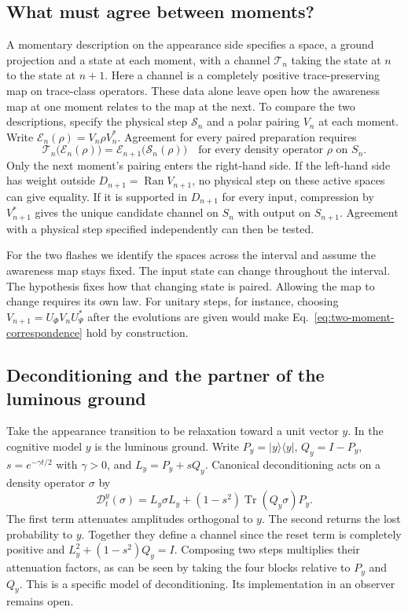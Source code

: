 \documentclass[11pt]{article}
\theoremstyle{definition}
\DeclareMathOperator{\Ran}{Ran}
\DeclareMathOperator{\Tr}{Tr}
\newcommand{\ket}[1]{\lvert #1\rangle}
\newcommand{\bra}[1]{\langle #1\rvert}
\begin{document}
\subsection{What must agree between moments?}
A momentary description on the appearance side specifies a space, a ground projection and a state at each moment, with a channel $\mathcal T_n$ taking the state at $n$ to the state at $n+1$. Here a channel is a completely positive trace-preserving map on trace-class operators. These data alone leave open how the awareness map at one moment relates to the map at the next. To compare the two descriptions, specify the physical step $\mathcal S_n$ and a polar pairing $V_n$ at each moment. Write $\mathcal E_n(\rho)=V_n\rho V_n^*$. Agreement for every paired preparation requires
\begin{equation}
 \mathcal T_n\bigl(\mathcal E_n(\rho)\bigr)
   =\mathcal E_{n+1}\bigl(\mathcal S_n(\rho)\bigr)
 \quad\text{for every density operator $\rho$ on $S_n$.}
 \label{eq:two-moment-correspondence}
\end{equation}
Only the next moment's pairing enters the right-hand side. If the left-hand side has weight outside $D_{n+1}=\Ran V_{n+1}$, no physical step on these active spaces can give equality. If it is supported in $D_{n+1}$ for every input, compression by $V_{n+1}^*$ gives the unique candidate channel on $S_n$ with output on $S_{n+1}$. Agreement with a physical step specified independently can then be tested.

For the two flashes we identify the spaces across the interval and assume the awareness map stays fixed. The input state can change throughout the interval. The hypothesis fixes how that changing state is paired. Allowing the map to change requires its own law. For unitary steps, for instance, choosing $V_{n+1}=U_\Phi V_n U_\Psi^*$ after the evolutions are given would make Eq.~\eqref{eq:two-moment-correspondence} hold by construction.

\subsection{Deconditioning and the partner of the luminous ground}
Take the appearance transition to be relaxation toward a unit vector $y$. In the cognitive model $y$ is the luminous ground. Write $P_y=\ket{y}\bra{y}$, $Q_y=I-P_y$, $s=e^{-\gamma t/2}$ with $\gamma>0$, and $L_y=P_y+sQ_y$. Canonical deconditioning acts on a density operator $\sigma$ by
\begin{equation}
 \mathcal D_t^y(\sigma)=L_y\sigma L_y+(1-s^2)\Tr(Q_y\sigma)P_y .
 \label{eq:moment-deconditioning}
\end{equation}
The first term attenuates amplitudes orthogonal to $y$. The second returns the lost probability to $y$. Together they define a channel since the reset term is completely positive and $L_y^2+(1-s^2)Q_y=I$. Composing two steps multiplies their attenuation factors, as can be seen by taking the four blocks relative to $P_y$ and $Q_y$. This is a specific model of deconditioning. Its implementation in an observer remains open.
\end{document}
